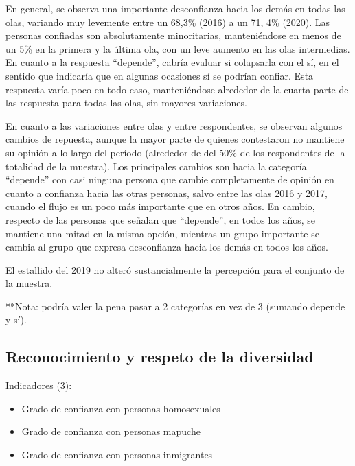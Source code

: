 \documentclass[
  12pt,
]{book}
\providecommand{\tightlist}{%
  \setlength{\itemsep}{0pt}\setlength{\parskip}{0pt}}
\begin{document}
En general, se observa una importante desconfianza hacia los demás en todas las olas, variando muy levemente entre un 68,3\% (2016) a un 71, 4\% (2020). Las personas confiadas son absolutamente minoritarias, manteniéndose en menos de un 5\% en la primera y la última ola, con un leve aumento en las olas intermedias. En cuanto a la respuesta ``depende'', cabría evaluar si colapsarla con el sí, en el sentido que indicaría que en algunas ocasiones sí se podrían confiar. Esta respuesta varía poco en todo caso, manteniéndose alrededor de la cuarta parte de las respuesta para todas las olas, sin mayores variaciones.

En cuanto a las variaciones entre olas y entre respondentes, se observan algunos cambios de repuesta, aunque la mayor parte de quienes contestaron no mantiene su opinión a lo largo del período (alrededor de del 50\% de los respondentes de la totalidad de la muestra). Los principales cambios son hacia la categoría ``depende'' con casi ninguna persona que cambie completamente de opinión en cuanto a confianza hacia las otras personas, salvo entre las olas 2016 y 2017, cuando el flujo es un poco más importante que en otros años. En cambio, respecto de las personas que señalan que ``depende'', en todos los años, se mantiene una mitad en la misma opción, mientras un grupo importante se cambia al grupo que expresa desconfianza hacia los demás en todos los años.

El estallido del 2019 no alteró sustancialmente la percepción para el conjunto de la muestra.

**Nota: podría valer la pena pasar a 2 categorías en vez de 3 (sumando depende y sí).

\hypertarget{reconocimiento-y-respeto-de-la-diversidad}{%
\subsection{Reconocimiento y respeto de la diversidad}\label{reconocimiento-y-respeto-de-la-diversidad}}

Indicadores (3):

\begin{itemize}
\tightlist
\item
  Grado de confianza con personas homosexuales
\item
  Grado de confianza con personas mapuche
\item
  Grado de confianza con personas inmigrantes
\end{itemize}
\end{document}
